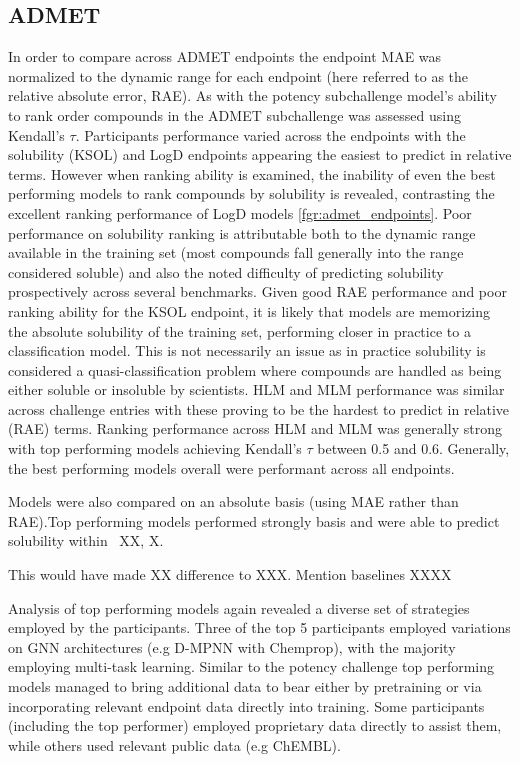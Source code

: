 \documentclass[journal=jcim,manuscript=article]{achemso}
\begin{document}
\subsection{ADMET}

In order to compare across ADMET endpoints the endpoint MAE was normalized to the dynamic range for each endpoint (here referred to as the relative absolute error, RAE). As with the potency subchallenge model's ability to rank order compounds in the ADMET subchallenge was assessed using Kendall's $\tau$. Participants performance varied across the endpoints with the solubility (KSOL) and LogD endpoints appearing the easiest to predict in relative terms. However when ranking ability is examined, the inability of even the best performing models to rank compounds by solubility is revealed, contrasting the excellent ranking performance of LogD models \ref{fgr:admet_endpoints}.  Poor performance on solubility ranking is attributable both to the dynamic range available in the training set (most compounds fall generally into the range considered soluble) and also the noted difficulty of predicting solubility prospectively across several benchmarks. Given good RAE performance and poor ranking ability for the KSOL endpoint, it is likely that models are memorizing the absolute solubility of the training set, performing closer in practice to a classification model. This is not necessarily an issue as in practice solubility is considered a quasi-classification problem where compounds are handled as being either soluble or insoluble by scientists. HLM and MLM performance was similar across challenge entries with these proving to be the hardest to predict in relative (RAE) terms. Ranking performance across HLM and MLM was generally strong with top performing models achieving Kendall's $\tau$ between 0.5 and 0.6. Generally, the best performing models overall were performant across all endpoints.

Models were also compared on an absolute basis (using MAE rather than RAE).Top performing models performed strongly basis and were able to predict solubility within ~XX, X. 

This would have made XX difference to XXX. Mention baselines XXXX


Analysis of top performing models again revealed a diverse set of strategies employed by the participants. Three of the top 5 participants employed variations on GNN architectures (e.g D-MPNN with Chemprop), with the majority employing multi-task learning. Similar to the potency challenge top performing models managed to bring additional data to bear either by pretraining or via incorporating relevant endpoint data directly into training. Some participants (including the top performer) employed proprietary data  directly to assist them, while others used relevant public data (e.g ChEMBL).
\end{document}
